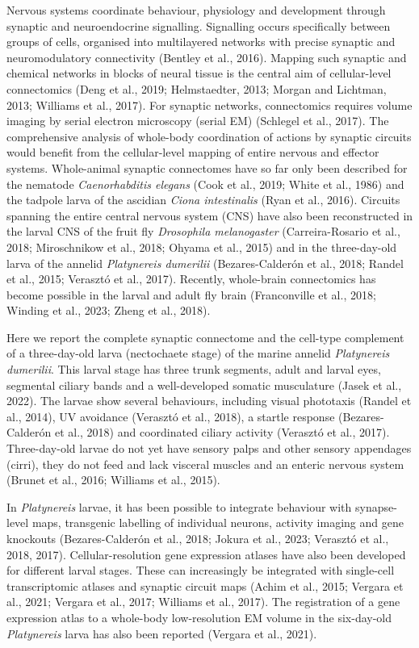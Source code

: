 \documentclass[
  11pt,
]{article}
\begin{document}
Nervous systems coordinate behaviour, physiology and development through
synaptic and neuroendocrine signalling. Signalling occurs specifically
between groups of cells, organised into multilayered networks with
precise synaptic and neuromodulatory connectivity (Bentley et al.,
2016). Mapping such synaptic and chemical networks in blocks of neural
tissue is the central aim of cellular-level connectomics (Deng et al.,
2019; Helmstaedter, 2013; Morgan and Lichtman, 2013; Williams et al.,
2017). For synaptic networks, connectomics requires volume imaging by
serial electron microscopy (serial EM) (Schlegel et al., 2017). The
comprehensive analysis of whole-body coordination of actions by synaptic
circuits would benefit from the cellular-level mapping of entire nervous
and effector systems. Whole-animal synaptic connectomes have so far only
been described for the nematode \emph{Caenorhabditis elegans} (Cook et
al., 2019; White et al., 1986) and the tadpole larva of the ascidian
\emph{Ciona intestinalis} (Ryan et al., 2016). Circuits spanning the
entire central nervous system (CNS) have also been reconstructed in the
larval CNS of the fruit fly \emph{Drosophila melanogaster}
(Carreira-Rosario et al., 2018; Miroschnikow et al., 2018; Ohyama et
al., 2015) and in the three-day-old larva of the annelid
\emph{Platynereis dumerilii} (Bezares-Calderón et al., 2018; Randel et
al., 2015; Verasztó et al., 2017). Recently, whole-brain connectomics
has become possible in the larval and adult fly brain (Franconville et
al., 2018; Winding et al., 2023; Zheng et al., 2018).

Here we report the complete synaptic connectome and the cell-type
complement of a three-day-old larva (nectochaete stage) of the marine
annelid \emph{Platynereis dumerilii}. This larval stage has three trunk
segments, adult and larval eyes, segmental ciliary bands and a
well-developed somatic musculature (Jasek et al., 2022). The larvae show
several behaviours, including visual phototaxis (Randel et al., 2014),
UV avoidance (Verasztó et al., 2018), a startle response
(Bezares-Calderón et al., 2018) and coordinated ciliary activity
(Verasztó et al., 2017). Three-day-old larvae do not yet have sensory
palps and other sensory appendages (cirri), they do not feed and lack
visceral muscles and an enteric nervous system (Brunet et al., 2016;
Williams et al., 2015).

In \emph{Platynereis} larvae, it has been possible to integrate
behaviour with synapse-level maps, transgenic labelling of individual
neurons, activity imaging and gene knockouts (Bezares-Calderón et al.,
2018; Jokura et al., 2023; Verasztó et al., 2018, 2017).
Cellular-resolution gene expression atlases have also been developed for
different larval stages. These can increasingly be integrated with
single-cell transcriptomic atlases and synaptic circuit maps (Achim et
al., 2015; Vergara et al., 2021; Vergara et al., 2017; Williams et al.,
2017). The registration of a gene expression atlas to a whole-body
low-resolution EM volume in the six-day-old \emph{Platynereis} larva has
also been reported (Vergara et al., 2021).
\end{document}
